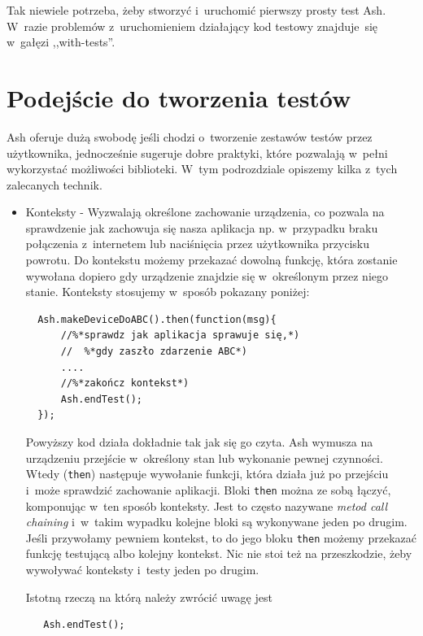 \documentclass[brudnopis]{xmgr}
\begin{document}
Tak niewiele potrzeba, żeby stworzyć i~uruchomić pierwszy prosty test Ash. W~razie problemów z~uruchomieniem działający kod testowy znajduje~się w~gałęzi ,,with-tests''.

\section{Podejście do tworzenia testów}

Ash oferuje dużą swobodę jeśli chodzi o~tworzenie zestawów testów przez użytkownika, jednocześnie sugeruje dobre praktyki, które pozwalają w~pełni wykorzystać możliwości biblioteki. W~tym podrozdziale opiszemy kilka z~tych zalecanych technik.    

\begin{itemize}
  \item Konteksty - Wyzwalają określone zachowanie urządzenia, co pozwala na sprawdzenie jak zachowuja się nasza aplikacja np. w~przypadku braku połączenia z~internetem lub naciśnięcia przez użytkownika przycisku powrotu. Do kontekstu możemy przekazać dowolną funkcję, która zostanie wywołana dopiero gdy urządzenie znajdzie się w~określonym przez niego stanie. Konteksty stosujemy w~sposób pokazany poniżej:

\begin{lstlisting}
  Ash.makeDeviceDoABC().then(function(msg){
      //%*sprawdz jak aplikacja sprawuje się,*) 
      //  %*gdy zaszło zdarzenie ABC*)
      ....
      //%*zakończ kontekst*)
      Ash.endTest();
  });
\end{lstlisting}

Powyższy kod działa dokładnie tak jak się go czyta. Ash wymusza na urządzeniu przejście w~określony stan lub wykonanie pewnej czynności. Wtedy (\texttt{then}) następuje wywołanie funkcji, która działa już po przejściu i~może sprawdzić zachowanie aplikacji. Bloki \texttt{then} można ze sobą łączyć, komponując w~ten sposób konteksty. Jest to często nazywane \textit{metod call chaining} i~w~takim wypadku kolejne bloki są wykonywane jeden po drugim. Jeśli przywołamy pewniem kontekst, to do jego bloku \texttt{then} możemy przekazać funkcję testującą albo kolejny kontekst. Nic nie stoi też na przeszkodzie, żeby wywoływać konteksty i~testy jeden po drugim. 

Istotną rzeczą na którą należy zwrócić uwagę jest 

\begin{lstlisting}
   Ash.endTest();
\end{lstlisting}


\end{itemize}
\end{document}
